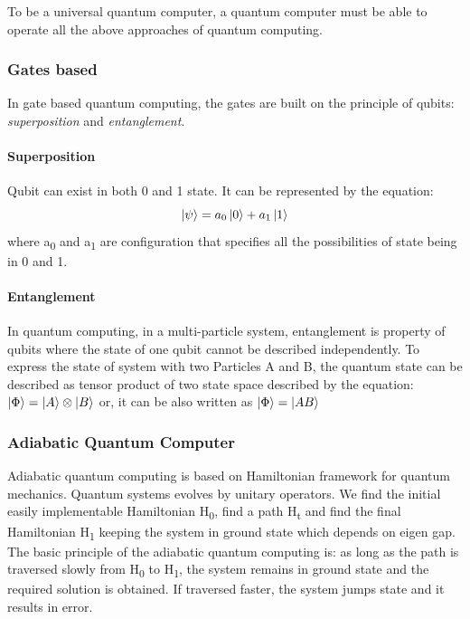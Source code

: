 \documentclass[12pt,conference]{IEEEtran}
\begin{document}
To be a universal quantum computer, a quantum computer must be able to operate all the above approaches of quantum computing.







\subsubsection{Gates based}
In gate based quantum computing, the gates are built on the principle of qubits: \emph{superposition} and \emph{entanglement}.

\paragraph{Superposition}
Qubit can exist in both 0 and 1 state. It can be represented by the equation:
\begin{equation*}
  \ket {\psi} = a_0 \ket{0} + a_1 \ket{1}
\end{equation*} 
where a\textsubscript{0} and a\textsubscript{1} are configuration that specifies all the possibilities of state being in 0 and 1.

\paragraph{Entanglement}
In quantum computing, in a multi-particle system, entanglement is property of qubits where the state of one qubit cannot be described independently. To express the state of system with two Particles A and B, the quantum state can be described as tensor product of two state space described by the equation:
$\ket {\Phi} = \ket{A} \otimes \ket{B}$
or, it can be also written as
$\ket {\Phi} = \ket{AB}$


\subsubsection{Adiabatic Quantum Computer}
Adiabatic quantum computing is based on Hamiltonian framework for quantum mechanics. Quantum systems evolves by unitary operators. We find the initial easily implementable Hamiltonian H\textsubscript{0}, find a path H\textsubscript{t} and find the final Hamiltonian H\textsubscript{1} keeping the system in ground state which depends on eigen gap. The basic principle of the adiabatic quantum computing is: as long as the path is traversed slowly from H\textsubscript{0} to H\textsubscript{1}, the system remains in ground state and the required solution is obtained. If traversed faster, the system jumps state and it results in error. 
\end{document}
